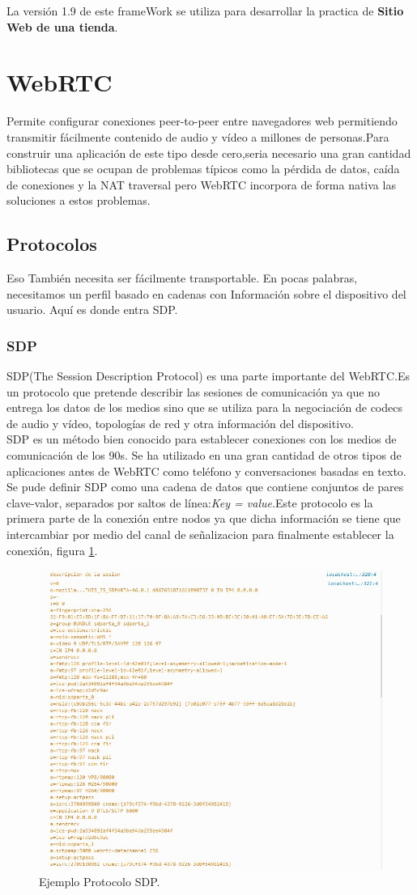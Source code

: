 La versión 1.9 de este frameWork se utiliza para desarrollar la practica de \textbf{Sitio Web de una tienda}.
\section{WebRTC}
Permite configurar conexiones peer-to-peer entre navegadores web permitiendo transmitir fácilmente contenido de audio y vídeo a millones de personas.Para construir una aplicación de este tipo desde cero,seria necesario una gran cantidad bibliotecas que se ocupan de problemas típicos como la pérdida de datos, caída de conexiones y la NAT traversal pero WebRTC\cite{webRTC} incorpora de forma nativa las soluciones a estos problemas.
\subsection{Protocolos}
Eso También necesita ser fácilmente transportable. En pocas palabras, necesitamos un perfil basado en cadenas con
Información sobre el dispositivo del usuario. Aquí es donde entra SDP.
\subsubsection*{SDP}
SDP(The Session Description Protocol) es una parte importante del WebRTC.Es un protocolo que pretende describir las sesiones de comunicación ya que no entrega los datos de los medios sino que se utiliza para la negociación de codecs de audio y vídeo, topologías de red y otra información del dispositivo.
\\SDP es un método bien conocido para establecer conexiones con los medios de comunicación de los 90s. Se ha utilizado en una gran cantidad de otros tipos de aplicaciones antes de WebRTC como teléfono y conversaciones basadas en texto.
\\Se pude definir SDP como una cadena de datos que contiene conjuntos de pares clave-valor, separados por saltos de línea:\textit{Key = value}.Este protocolo es la primera parte de la conexión entre nodos ya que dicha información se tiene que intercambiar por medio del canal de señalizacion para finalmente establecer la conexión, figura \ref{fig:DescripcionSDP}.
\begin{figure}[!h]
\begin{center}
   \includegraphics[width=0.5\linewidth]{Figures/DescripcionSDP}
	\decoRule
	\caption[Ejemplo Protocolo SDP]{Ejemplo Protocolo SDP.}
\label{fig:DescripcionSDP}
\end{center}
\end{figure}
